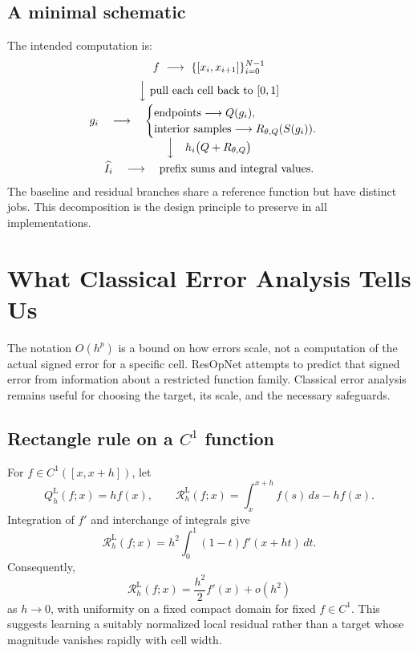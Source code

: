 \subsection{A minimal schematic}

The intended computation is:
\[
    \begin{array}{c}
        f\ \longrightarrow\ \{[x_i,x_{i+1}]\}_{i=0}^{N-1}
        \\[2mm]
        \Big\downarrow\ \text{pull each cell back to }[0,1]
        \\[2mm]
        g_i
        \quad\longrightarrow\quad
        \begin{cases}
            \text{endpoints}\longrightarrow Q(g_i), \\
            \text{interior samples}\longrightarrow
            R_{\theta,Q}(S(g_i)).
        \end{cases}
        \\[2mm]
        \Big\downarrow\quad h_i\bigl(Q+R_{\theta,Q}\bigr)
        \\[2mm]
        \widehat I_i
        \quad\longrightarrow\quad
        \text{prefix sums and integral values}.
    \end{array}
\]
The baseline and residual branches share a reference function but have
distinct jobs. This decomposition is the design principle to preserve in
all implementations.

\section{What Classical Error Analysis Tells Us}
\label{sec:resop-regularity}

The notation $O(h^p)$ is a bound on how errors scale, not a computation of
the actual signed error for a specific cell. ResOpNet attempts to predict
that signed error from information about a restricted function family.
Classical error analysis remains useful for choosing the target, its scale,
and the necessary safeguards.

\subsection{Rectangle rule on a $C^1$ function}

For $f\in C^1([x,x+h])$, let
\[
    Q_h^{\mathrm L}(f;x)=hf(x),\qquad
    \mathcal R_h^{\mathrm L}(f;x)
    =\int_x^{x+h}f(s)\,ds-hf(x).
\]
Integration of $f'$ and interchange of integrals give
\begin{equation}
    \mathcal R_h^{\mathrm L}(f;x)
    =h^2\int_0^1(1-t)f'(x+ht)\,dt.
    \label{eq:resop-rectangle-error}
\end{equation}
Consequently,
\[
    \mathcal R_h^{\mathrm L}(f;x)
    =\frac{h^2}{2}f'(x)+o(h^2)
\]
as $h\to0$, with uniformity on a fixed compact domain for fixed $f\in C^1$.
This suggests learning a suitably normalized local residual rather than
a target whose magnitude vanishes rapidly with cell width.

